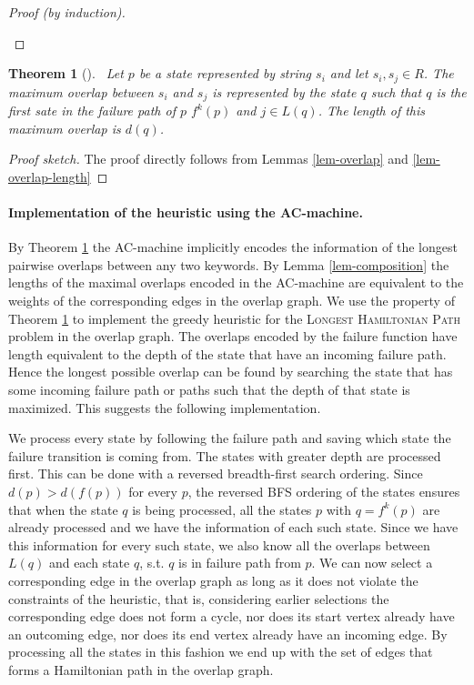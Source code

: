 \documentclass[english,twoside,censored,csm,algorithms-track-2020]{HYthesisML}
\theoremstyle{plain}
\newtheorem{theorem}{Theorem}[chapter]
\theoremstyle{definition}
\numberwithin{testexample}{chapter}
\begin{document}
\begin{proof}[Proof (by induction)]
\begin{enumerate}[leftmargin=28pt]
  \end{enumerate}
\end{proof}

\begin{theorem}[] ~\label{thm-maximal-overlaps}
  Let $p$ be a state represented by string $s_i$ and let $s_i,s_j\in R$. The maximum overlap between
  $s_i$ and $s_j$ is represented by the state $q$ such that $q$ is the first sate in the failure
  path of $p$ $f^k(p)$ and $j\in L(q)$. The length of this maximum overlap is $d(q)$.
\end{theorem}
\begin{proof}[Proof sketch]
  The proof directly follows from Lemmas \ref{lem-overlap} and \ref{lem-overlap-length}
\end{proof}

\paragraph{Implementation of the heuristic using the AC-machine.}
By Theorem \ref{thm-maximal-overlaps} the AC-machine implicitly encodes the information of the
longest pairwise overlaps between any two keywords. By Lemma \ref{lem-composition} the lengths of the
maximal overlaps encoded in the AC-machine are equivalent to the weights of the corresponding edges
in the overlap graph. We use the property of Theorem \ref{thm-maximal-overlaps} to implement
the greedy heuristic for the \textsc{Longest Hamiltonian Path} problem in the overlap graph. The
overlaps encoded by the failure function have length equivalent to the depth of the state that
have an incoming failure path. Hence the longest possible overlap can be found by searching the state
that has some incoming failure path or paths such that the depth of that state is maximized. This suggests
the following implementation.

We process every state by following the failure path and saving 
which state the failure transition is coming from. 
The states with greater depth are processed first. This can be done with a reversed breadth-first
search ordering. Since $d(p) > d(f(p))$ for every $p$, the reversed BFS ordering of the states
ensures that when the state $q$ is being processed, all the states $p$ with $q=f^k(p)$ are already
processed and we have the information of each such state. Since we have this information for every such
state, we also know all the overlaps between $L(q)$ and each state $q$, s.t.
$q$ is in failure path from $p$. We can now select a corresponding edge in the overlap graph as long
as it does not violate the constraints of the heuristic, that is, considering earlier selections
the corresponding edge does not form a cycle, nor does its start vertex already have an outcoming
edge, nor does its end vertex already have an incoming edge. By processing all the states in this
fashion we end up with the set of edges that forms a Hamiltonian path in the
overlap graph. 
\end{document}
